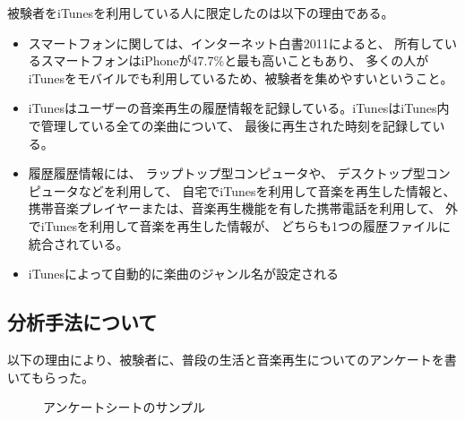 \documentclass[11pt, onecolumn]{jsarticle}
\begin{document}
被験者をiTunesを利用している人に限定したのは以下の理由である。
\begin{itemize}
\item
スマートフォンに関しては、インターネット白書2011によると、
所有しているスマートフォンはiPhoneが47.7\%と最も高いこともあり、
多くの人がiTunesをモバイルでも利用しているため、被験者を集めやすいということ。
\item
iTunesはユーザーの音楽再生の履歴情報を記録している。iTunesはiTunes内で管理している全ての楽曲について、 最後に再生された時刻を記録している。
\item
履歴履歴情報には、
ラップトップ型コンピュータや、
デスクトップ型コンピュータなどを利用して、
自宅でiTunesを利用して音楽を再生した情報と、
携帯音楽プレイヤーまたは、音楽再生機能を有した携帯電話を利用して、
外でiTunesを利用して音楽を再生した情報が、
どちらも1つの履歴ファイルに統合されている。
\item
iTunesによって自動的に楽曲のジャンル名が設定される
\end{itemize}

\subsection{分析手法について}
以下の理由により、被験者に、普段の生活と音楽再生についてのアンケートを書いてもらった。

\begin{figure}[htbp]
\begin{center}
\caption{アンケートシートのサンプル}
\end{center}
\label{sheet_sample}
\end{figure}
\end{document}
